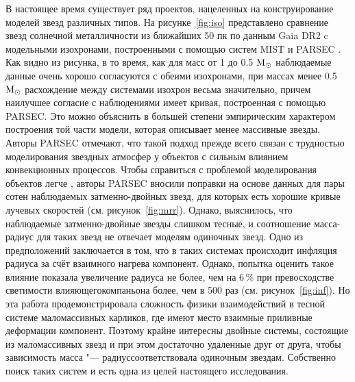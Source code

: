 В настоящее время существует ряд проектов, нацеленных на конструирование моделей звезд различных типов. На рисунке~\ref{fig:iso} представлено сравнение звезд солнечной металличности из ближайших 50 пк по данным Gaia DR2 c модельными изохронами, построенными с помощью систем MIST  и PARSEC . Как видно из рисунка, в то время, как для масс от 1 до 0.5 \(\textup{M}_\odot\) наблюдаемые данные очень хорошо согласуются с обеими изохронами, при массах менее 0.5 \(\textup{M}_\odot\) расхождение между системами изохрон весьма значительно, причем наилучшее согласие с наблюдениями имеет кривая, построенная с помощью PARSEC. Это можно объяснить в большей степени эмпирическим характером построения той части модели, которая описывает менее массивные звезды. Авторы PARSEC отмечают, что такой подход прежде всего связан с трудностью моделирования звездных атмосфер у объектов с сильным влиянием конвекционных процессов. Чтобы справиться с проблемой моделирования объектов легче , авторы PARSEC вносили поправки на основе данных для пары сотен наблюдаемых затменно-двойных звезд, для которых есть хорошие кривые лучевых скоростей (см. рисунок~\ref{fig:mrr}). Однако, выяснилось, что наблюдаемые затменно-двойные звезды слишком тесные, и соотношение масса-радиус для таких звезд не отвечает моделям одиночных звезд. Одно из предположений заключается в том, что в таких системах происходит инфляция радиуса за счёт взаимного нагрева компонент. Однако, попытка оценить такое влияние показала увеличение радиуса не более, чем на 6\,\%  при превосходстве светимости \glqq влияющего\grqq компаньона более, чем в 500 раз (см. рисунок~\ref{fig:inf}). Но эта работа продемонстрировала сложность физики взаимодействий в тесной системе маломассивных карликов, где имеют место  взаимные приливные деформации компонент. Поэтому крайне интересны двойные системы, состоящие из маломассивных звезд и при этом достаточно удаленные друг от друга, чтобы зависимость \glqq масса "--- радиус\glqq соответствовала одиночным звездам. Собственно поиск таких систем и есть одна из целей настоящего исследования.

